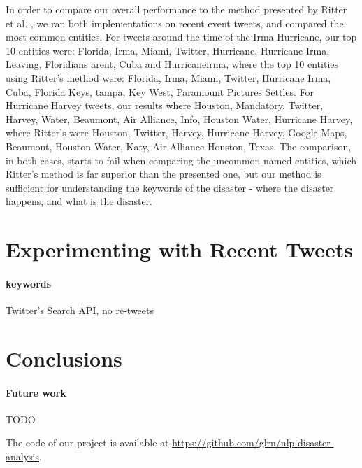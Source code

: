 \documentclass[letterpaper,twocolumn,10pt]{article}
\begin{document}
In order to compare our overall performance to the method presented by Ritter et al. \cite{Ritter11}, we ran both implementations on recent event tweets, and compared the most common entities. For tweets around the time of the Irma Hurricane, our top 10 entities were: Florida, Irma, Miami, Twitter, Hurricane, Hurricane Irma, Leaving, Floridians arent, Cuba and Hurricaneirma, where the top 10 entities using Ritter's method were: Florida, Irma, Miami, Twitter, Hurricane Irma, Cuba, Florida Keys, tampa, Key West, Paramount Pictures Settles. For Hurricane Harvey tweets, our results where Houston, Mandatory, Twitter, Harvey, Water, Beaumont, Air Alliance, Info, Houston Water, Hurricane Harvey, where Ritter's were Houston, Twitter, Harvey, Hurricane Harvey, Google Maps, Beaumont, Houston Water, Katy, Air Alliance Houston, Texas. The comparison, in both cases, starts to fail when comparing the uncommon named entities, which Ritter's method is far superior than the presented one, but our method is sufficient for understanding the keywords of the disaster - where the disaster happens, and what is the disaster.


\section{Experimenting with Recent Tweets} \label{recent-tweets-results}

\paragraph{keywords}Twitter's Search API, no re-tweets



\section{Conclusions}

\paragraph{Future work} TODO

The code of our project is available at \url{https://github.com/glrn/nlp-disaster-analysis}.



{\footnotesize 
}

\theendnotes
\end{document}
